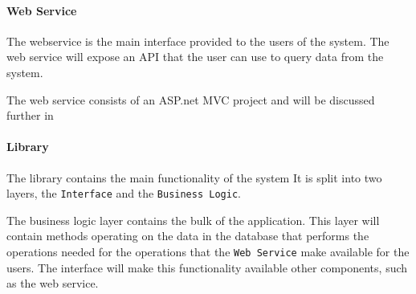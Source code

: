 \paragraph{Web Service}
The webservice is the main interface provided to the users of the system.
The web service will expose an API that the user can use to query data from the system.

The web service consists of an ASP.net MVC project and will be discussed further in 

\paragraph{Library}
The library contains the main functionality of the system 
It is split into two layers, the \texttt{Interface} and the \texttt{Business Logic}.

The business logic layer contains the bulk of the application.
This layer will contain methods operating on the data in the database that performs the operations needed for the operations that the \texttt{Web Service} make available for the users.
The interface will make this functionality available other components, such as the web service.





